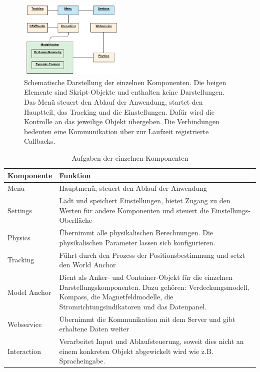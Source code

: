 \begin{figure}[H]
	\centering
	\includegraphics[width=0.45\textwidth]{images/schema/components.jpg}
	\caption{Schematische Darstellung der einzelnen Komponenten. Die beigen Elemente sind Skript-Objekte und enthalten keine Darstellungen. Das Menü steuert den Ablauf der Anwendung, startet den Hauptteil, das Tracking und die Einstellungen. Dafür wird die Kontrolle an das jeweilige Objekt übergeben. Die Verbindungen bedeuten eine Kommunikation über zur Laufzeit registrierte Callbacks.}
	\label{img:components-schema}
\end{figure}


\bgroup
\setlength\extrarowheight{-2pt}
\def\arraystretch{2}
\begin{table}[H]
	\centering
	\begin{tabular}{m{2.5cm}|m{8cm}}
		Komponente & Funktion\\
		\hline
		\hline
		Menu & Hauptmenü, steuert den Ablauf der Anwendung\\
		\hline
		Settings & Lädt und speichert Einstellungen, bietet Zugang zu den Werten für andere Komponenten und steuert die Einstellungs-Oberfläche\\
		\hline
		Physics & Übernimmt alle physikalischen Berechnungen. Die physikalischen Parameter lassen sich konfigurieren.\\
		\hline
		Tracking & Führt durch den Prozess der Positionsbestimmung und setzt den World Anchor\\
		\hline
		Model Anchor & Dient als Anker- und Container-Objekt für die einzelnen Darstellungskomponenten. Dazu gehören: Verdeckungsmodell, Kompass, die Magnetfeldmodelle, die Stromrichtungsindikatoren und das Datenpanel.\\
		\hline
		Webservice & Übernimmt die Kommunikation mit dem Server und gibt erhaltene Daten weiter\\
		\hline
		Interaction & Verarbeitet Input und Ablaufsteuerung, soweit dies nicht an einem konkreten Objekt abgewickelt wird wie z.B. Spracheingabe.\\
	\end{tabular}\caption{\label{tab:components-details} Aufgaben der einzelnen Komponenten}
\end{table}
\egroup

